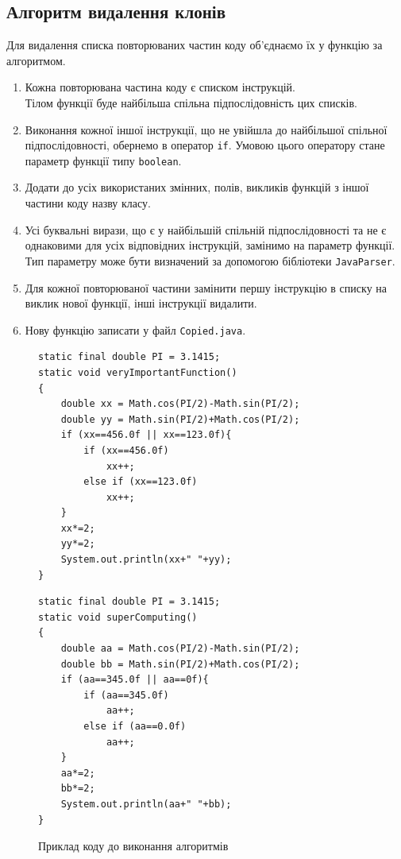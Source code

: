 \documentclass[a4paper, 14pt]{article}
\begin{document}
\subsection{Алгоритм видалення клонів}
Для видалення списка повторюваних частин коду об'єднаємо їх у функцію за алгоритмом. \\
\begin{enumerate}
\item Кожна повторювана частина коду є списком інструкцій. \\
Тілом функції буде найбільша спільна підпослідовність цих списків.
\item Виконання кожної іншої інструкції, що не увійшла до найбільшої спільної підпослідовності, обернемо в оператор \verb|if|.
Умовою цього оператору стане параметр функції типу \verb|boolean|.
\item Додати до усіх використаних змінних, полів, викликів функцій з іншої частини коду назву класу.
\item Усі буквальні вирази, що є у найбільшій спільній підпослідовності та не є однаковими для усіх відповідних інструкцій, замінимо на параметр функції. Тип параметру може бути визначений за допомогою бібліотеки \verb|JavaParser|.
\item Для кожної повторюваної частини замінити першу інструкцію в списку на виклик нової функції, інші інструкції видалити.
\item Нову функцію записати у файл \verb|Copied.java|.
\end{enumerate}
\newpage
\begin{figure}[h!]
\centering
\begin{minipage}{.45\textwidth}
\begin{lstlisting}[frame=none]
static final double PI = 3.1415;
static void veryImportantFunction()
{
	double xx = Math.cos(PI/2)-Math.sin(PI/2);
	double yy = Math.sin(PI/2)+Math.cos(PI/2);
	if (xx==456.0f || xx==123.0f){
		if (xx==456.0f)
			xx++;
		else if (xx==123.0f)
			xx++;
	}
	xx*=2;
	yy*=2;
	System.out.println(xx+" "+yy);
}
\end{lstlisting}
\end{minipage}
\begin{minipage}{.45\textwidth}
\begin{lstlisting}[frame=none]
static final double PI = 3.1415;
static void superComputing()
{
	double aa = Math.cos(PI/2)-Math.sin(PI/2);
	double bb = Math.sin(PI/2)+Math.cos(PI/2);
	if (aa==345.0f || aa==0f){
		if (aa==345.0f)
			aa++;
		else if (aa==0.0f)
			aa++;
	}
	aa*=2;
	bb*=2;
	System.out.println(aa+" "+bb);
}
\end{lstlisting}
\end{minipage}
\caption{Приклад коду до виконання алгоритмів}
\end{figure}
\end{document}
